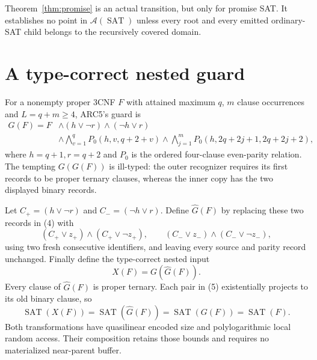 \documentclass[11pt]{article}
\newcommand{\SAT}{\operatorname{SAT}}
\newcommand{\A}{\mathcal A}
\begin{document}
Theorem~\ref{thm:promise} is an actual transition, but only for promise SAT.
It establishes no point in $\A(\SAT)$ unless every root and every emitted
ordinary-SAT child belongs to the recursively covered domain.

\section{A type-correct nested guard}
For a nonempty proper 3CNF $F$ with attained maximum $q$, $m$ clause
occurrences and $L=q+m\ge4$, ARC5's guard is
\[
\begin{split}
G(F)=F&\wedge(h\vee\neg r)\wedge(\neg h\vee r)\\
&\wedge\bigwedge_{v=1}^{q}P_0(h,v,q+2+v)
 \wedge\bigwedge_{j=1}^{m}P_0(h,2q+2j+1,2q+2j+2),
\end{split}\tag{4}
\]
where $h=q+1,r=q+2$ and $P_0$ is the ordered four-clause even-parity
relation.  The tempting $G(G(F))$ is ill-typed: the outer recognizer requires
its first records to be proper ternary clauses, whereas the inner copy has
the two displayed binary records.

Let $C_+=(h\vee\neg r)$ and $C_-=(\neg h\vee r)$.  Define
$\widehat G(F)$ by replacing these two records in (4) with
\[
 (C_+\vee z_+)\wedge(C_+\vee\neg z_+),\qquad
 (C_-\vee z_-)\wedge(C_-\vee\neg z_-),                  \tag{5}
\]
using two fresh consecutive identifiers, and leaving every source and parity
record unchanged.  Finally define the type-correct nested input
\[
                         X(F)=G(\widehat G(F)).           \tag{6}
\]
Every clause of $\widehat G(F)$ is proper ternary.  Each pair in (5)
existentially projects to its old binary clause, so
\[
 \SAT(X(F))=\SAT(\widehat G(F))=\SAT(G(F))=\SAT(F).       \tag{7}
\]
Both transformations have quasilinear encoded size and polylogarithmic
local random access.  Their composition retains those bounds and requires no
materialized near-parent buffer.
\end{document}

